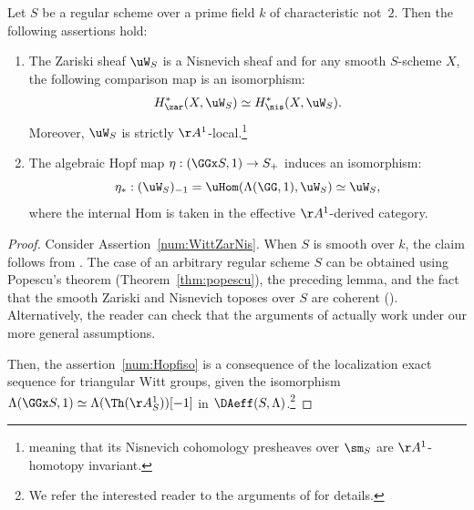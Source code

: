 \begin{thm}\label{thm:representability_Witt}
Let $S$ be a regular scheme over a prime field $k$ of characteristic not~$2$.
Then the following assertions hold:
\begin{enumerate}
\item
\label{num:WittZarNis}
The Zariski sheaf $\uW_S$ is a Nisnevich sheaf and for any smooth $S$-scheme $X$,
the following comparison map is an isomorphism:
\begin{equation}
H^*_\zar(X,\uW_S) \simeq H^*_\nis(X,\uW_S).
\end{equation}
Moreover, $\uW_S$ is strictly $\AA^1$-local.\footnote{meaning that
its Nisnevich cohomology presheaves over $\sm_S$ are $\AA^1$-homotopy invariant.}
\item
\label{num:Hopfiso}
The algebraic Hopf map $\eta:(\GGx S,1) \to S_+$
induces an isomorphism:
\begin{equation}
\label{eq:Witt_Susp}
\eta_*:(\uW_S)_{-1}=\uHom(\Lambda(\GG,1),\uW_S) \simeq \uW_S,
\end{equation}
where the internal Hom is taken in the effective $\AA^1$-derived category.
\end{enumerate}
\end{thm}
\begin{proof}
Consider Assertion~\eqref{num:WittZarNis}.
When $S$ is smooth over $k$, the claim follows from \cite{Panin}.
The case of an arbitrary regular scheme $S$
can be obtained using Popescu's theorem (Theorem~\ref{thm:popescu}), the preceding lemma, and the fact that the smooth Zariski and Nisnevich toposes over $S$ are coherent (\cite[Exp.\,VI, 2.3]{SGA4}).
Alternatively, the reader can check that the arguments of \cite{Panin} actually work under our more general assumptions.

Then, the assertion~\eqref{num:Hopfiso} is a consequence of the localization exact sequence for triangular Witt groups,
given the isomorphism $\Lambda(\GGx S,1) \simeq \Lambda(\Th(\AA^1_S))[-1]$
in $\DAeff(S,\Lambda)$.\footnote{We refer the interested
reader to the arguments of \cite[Lem.\,3.8]{CF1} for details.}
\end{proof}

